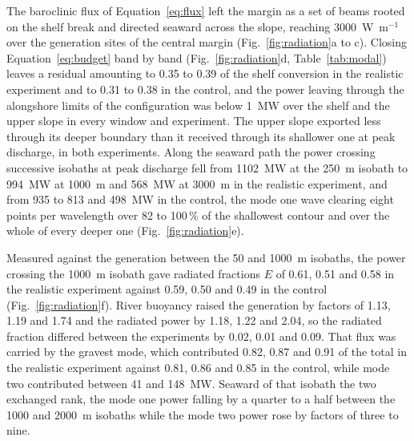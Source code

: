 \documentclass[a4paper,fleqn]{cas-sc}
\begin{document}
The baroclinic flux of Equation~\ref{eq:flux} left the margin as a set of beams rooted on the shelf break and directed seaward across the slope, reaching 3000~W~m$^{-1}$ over the generation sites of the central margin (Fig.~\ref{fig:radiation}a to c). Closing Equation~\ref{eq:budget} band by band (Fig.~\ref{fig:radiation}d, Table~\ref{tab:modal}) leaves a residual amounting to 0.35 to 0.39 of the shelf conversion in the realistic experiment and to 0.31 to 0.38 in the control, and the power leaving through the alongshore limits of the configuration was below 1~MW over the shelf and the upper slope in every window and experiment. The upper slope exported less through its deeper boundary than it received through its shallower one at peak discharge, in both experiments. Along the seaward path the power crossing successive isobaths at peak discharge fell from 1102~MW at the 250~m isobath to 994~MW at 1000~m and 568~MW at 3000~m in the realistic experiment, and from 935 to 813 and 498~MW in the control, the mode one wave clearing eight points per wavelength over 82 to 100\,\% of the shallowest contour and over the whole of every deeper one (Fig.~\ref{fig:radiation}e).

Measured against the generation between the 50 and 1000~m isobaths, the power crossing the 1000~m isobath gave radiated fractions $E$ of 0.61, 0.51 and 0.58 in the realistic experiment against 0.59, 0.50 and 0.49 in the control (Fig.~\ref{fig:radiation}f). River buoyancy raised the generation by factors of 1.13, 1.19 and 1.74 and the radiated power by 1.18, 1.22 and 2.04, so the radiated fraction differed between the experiments by 0.02, 0.01 and 0.09. That flux was carried by the gravest mode, which contributed 0.82, 0.87 and 0.91 of the total in the realistic experiment against 0.81, 0.86 and 0.85 in the control, while mode two contributed between 41 and 148~MW. Seaward of that isobath the two exchanged rank, the mode one power falling by a quarter to a half between the 1000 and 2000~m isobaths while the mode two power rose by factors of three to nine.
\end{document}

